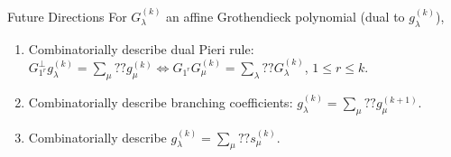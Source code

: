 \documentclass{beamer}
\newcommand{\G}{\mathfrak{G}}
\begin{document}
\begin{frame}{Future Directions}
    For \(G_\lambda^{(k)}\) an affine Grothendieck polynomial (dual to \(g_\lambda^{(k)}\)),\pause
    \begin{enumerate}
    \item Combinatorially describe dual Pieri rule: \(G_{1^r}^\perp g_\lambda^{(k)} = \sum_\mu
      ?? g_\mu^{(k)} \iff G_{1^r} G_\mu^{(k)} = \sum_\lambda ?? G_\lambda^{(k)}\),  \(1 \leq r \leq k\).\pause
    \item Combinatorially describe branching coefficients: \(g_\lambda^{(k)} =
      \sum_\mu ?? g_\mu^{(k+1)}\).\pause
    \item Combinatorially describe \(g_\lambda^{(k)} = \sum_\mu ??
      s_\mu^{(k)}\).%
    \end{enumerate}
\end{frame}
\end{document}
